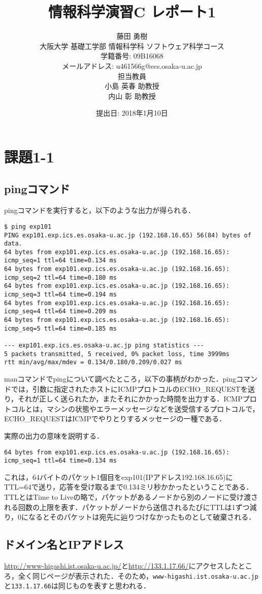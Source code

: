 \documentclass[a4j,10pt,titlepage]{jsarticle}
\title{情報科学演習C レポート1}
\author{藤田 勇樹 \\
大阪大学 基礎工学部 情報科学科 ソフトウェア科学コース\\
学籍番号: 09B16068 \\
メールアドレス: u461566g@ecs.osaka-u.ac.jp \\
担当教員\\
小島 英春 助教授 \\
内山 彰 助教授}
\date{提出日: 2018年1月10日}
\begin{document}
\maketitle
\section{課題1-1}
\subsection{pingコマンド}
pingコマンドを実行すると，以下のような出力が得られる．
\begin{verbatim}
$ ping exp101 
PING exp101.exp.ics.es.osaka-u.ac.jp (192.168.16.65) 56(84) bytes of data.
64 bytes from exp101.exp.ics.es.osaka-u.ac.jp (192.168.16.65): icmp_seq=1 ttl=64 time=0.134 ms
64 bytes from exp101.exp.ics.es.osaka-u.ac.jp (192.168.16.65): icmp_seq=2 ttl=64 time=0.180 ms
64 bytes from exp101.exp.ics.es.osaka-u.ac.jp (192.168.16.65): icmp_seq=3 ttl=64 time=0.194 ms
64 bytes from exp101.exp.ics.es.osaka-u.ac.jp (192.168.16.65): icmp_seq=4 ttl=64 time=0.209 ms
64 bytes from exp101.exp.ics.es.osaka-u.ac.jp (192.168.16.65): icmp_seq=5 ttl=64 time=0.185 ms

--- exp101.exp.ics.es.osaka-u.ac.jp ping statistics ---
5 packets transmitted, 5 received, 0% packet loss, time 3999ms
rtt min/avg/max/mdev = 0.134/0.180/0.209/0.027 ms
\end{verbatim}

manコマンドでpingについて調べたところ，以下の事柄がわかった．pingコマンドでは，引数に指定されたホストにICMPプロトコルのECHO\_REQUESTを送り，それが正しく送られたか，またそれにかかった時間を出力する．ICMPプロトコルとは，マシンの状態やエラーメッセージなどを送受信するプロトコルで，ECHO\_REQUESTはICMPでやりとりするメッセージの一種である．

実際の出力の意味を説明する．
\begin{verbatim}
64 bytes from exp101.exp.ics.es.osaka-u.ac.jp (192.168.16.65): icmp_seq=1 ttl=64 time=0.134 ms
\end{verbatim}
これは，64バイトのパケット1個目をexp101(IPアドレス192.168.16.65)にTTL=64で送り，応答を受け取るまで0.134ミリ秒かかったということである．TTLとはTime to Liveの略で，パケットがあるノードから別のノードに受け渡される回数の上限を表す．パケットがノードから送信されるたびにTTLは1ずつ減り，0になるとそのパケットは宛先に辿りつけなかったものとして破棄される．

\subsection{ドメイン名とIPアドレス}\label{sec:domainip}
\url{http://www-higashi.ist.osaka-u.ac.jp/}と\url{http://133.1.17.66/}にアクセスしたところ，全く同じページが表示された．そのため，\verb|www-higashi.ist.osaka-u.ac.jp|と\verb|133.1.17.66|は同じものを表すと思われる．
\end{document}
